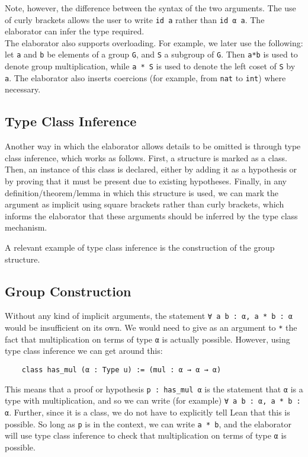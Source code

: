 \documentclass[runningheads,a4paper]{llncs}
\renewcommand{\-}{\setminus}
\begin{document}
Note, however, the difference between the syntax of the two arguments. The use of curly brackets allows the user to write \lstinline{id a} rather than \lstinline{id α a}. The elaborator can infer the type required.\\

The elaborator also supports overloading. For example, we later use the following: let \lstinline{a} and \lstinline{b} be elements of a group \lstinline{G}, and \lstinline{S} a subgroup of \lstinline{G}. Then \lstinline{a*b} is used to denote group multiplication, while \lstinline{a * S} is used to denote the left coset of \lstinline{S} by \lstinline{a}. The elaborator also inserts coercions (for example, from \lstinline{nat} to \lstinline{int}) where necessary.

\subsection{Type Class Inference}

Another way in which the elaborator allows details to be omitted is through type class inference, which works as follows. First, a structure is marked as a class. Then, an instance of this class is declared, either by adding it as a hypothesis or by proving that it must be present due to existing hypotheses. Finally, in any definition/theorem/lemma in which this structure is used, we can mark the argument as implicit using square brackets rather than curly brackets, which informs the elaborator that these arguments should be inferred by the type class mechanism.

A relevant example of type class inference is the construction of the group structure.

\subsection{Group Construction}

Without any kind of implicit arguments, the statement \lstinline{∀ a b : α, a * b : α} would be insufficient on its own. We would need to give as an argument to \lstinline{*} the fact that multiplication on terms of type \lstinline{α} is actually possible. However, using type class inference we can get around this:

\begin{lstlisting}
    class has_mul (α : Type u) := (mul : α → α → α)
\end{lstlisting}

This means that a proof or hypothesis \lstinline{p : has_mul α} is the statement that \lstinline{α} is a type with multiplication, and so we can write (for example) \lstinline{∀ a b : α, a * b : α}. Further, since it is a class, we do not have to explicitly tell Lean that this is possible. So long as \lstinline{p} is in the context, we can write \lstinline{a * b}, and the elaborator will use type class inference to check that multiplication on terms of type \lstinline{α} is possible.
\end{document}
